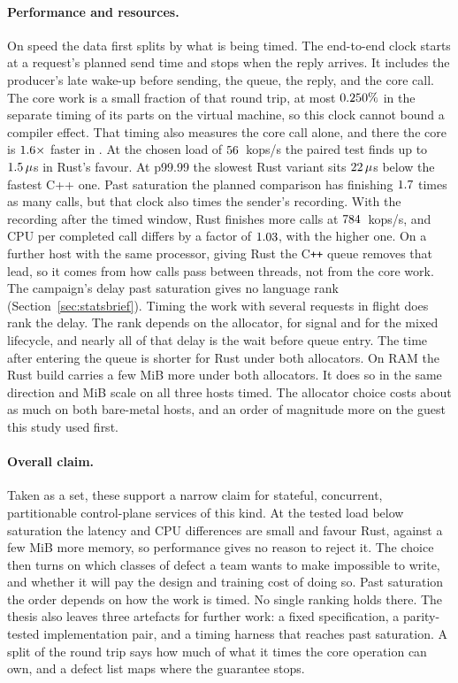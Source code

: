 \documentclass[english,oneside,a4paper,censored,csm,software-track-2020]{HYthesisML}
\begin{document}
\paragraph{Performance and resources.}
On speed the data first splits by what is being timed. The end-to-end clock
starts at a request's planned send time and stops when the reply arrives.
It includes the producer's late wake-up before sending, the queue, the reply, and the core
call. The core work is a small
fraction of that round trip, at most $0.250\%$ in the separate
timing of its parts on the virtual machine, so this clock cannot bound a compiler
effect. That timing also measures the core call alone, and there the core is
$1.6\times$ faster in \BudgetCoreFaster{}. At the chosen load of
$56$~kops/s the paired test finds up to $1.5\,\mu$s in Rust's
favour. At p99.99 the slowest Rust variant sits $22\,\mu$s below the
fastest C++ one. Past saturation the planned comparison has
\OverloadSustainedFaster{} finishing $1.7$ times as many calls, but
that clock also times the sender's recording. With the recording after the timed
window, Rust finishes more calls at $784$~kops/s, and CPU per
completed call differs by a factor of $1.03$, with
\ProbeAfterCpuPerOpHigher{} the higher one. On a further host with the same
processor, giving Rust the C\texttt{++} queue removes that lead, so it comes from
how calls pass between threads, not from the core work. The campaign's delay past
saturation gives no language rank (Section~\ref{sec:statsbrief}). Timing the work
with several requests in flight does rank the delay.
The rank depends on the allocator, for signal and for the mixed lifecycle, and nearly all of
that delay is the wait before queue entry. The time after entering the queue is shorter for
Rust under both allocators. On RAM
the Rust build carries a few MiB more under both allocators. It does so in
the same direction and MiB scale on all three hosts timed. The
allocator choice costs about as much on both bare-metal hosts, and an order of
magnitude more on the guest this study used first.

\paragraph{Overall claim.}
Taken as a set, these support a narrow claim for stateful, concurrent,
partitionable control-plane services of this kind. At the tested load below saturation the
latency and CPU differences are small and favour Rust, against a few MiB more memory, so
performance gives no reason to reject it. The choice then turns on which classes
of defect a team wants to make impossible to write, and whether it will pay the
design and training cost of doing so. Past saturation the order depends on how
the work is timed. No single ranking holds there. The thesis also leaves three
artefacts for further work: a fixed specification, a parity-tested
implementation pair, and a timing harness that reaches past saturation. A split
of the round trip says how much of what it times the core operation can own, and
a defect list maps where the guarantee stops.
\end{document}
